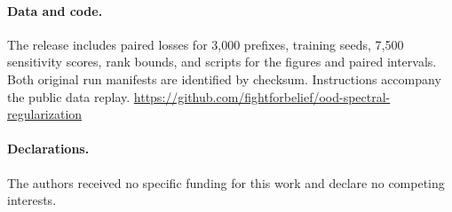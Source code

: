 

\paragraph{Data and code.} The release includes paired losses for 3,000 prefixes, training seeds, 7,500 sensitivity scores, rank bounds, and scripts for the figures and paired intervals. Both original run manifests are identified by checksum. Instructions accompany the public data replay.
\url{https://github.com/fightforbelief/ood-spectral-regularization}

\paragraph{Declarations.} The authors received no specific funding for this work and declare no competing interests.
